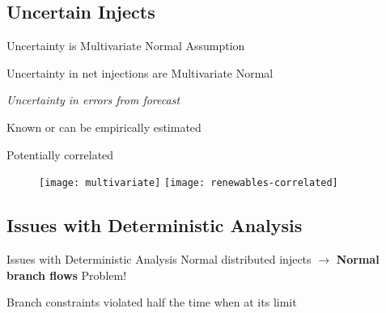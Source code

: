 
\subsection{Uncertain Injects}

\begin{frame}{Uncertainty is Multivariate Normal}
\alert{Assumption}

Uncertainty in net injections are Multivariate Normal
\bi
\item \textit{Uncertainty in errors from forecast}
\item Known or can be empirically estimated
\item Potentially correlated
\ei
\begin{center}
\begin{figure}
   \texttt{[image: multivariate]}
   \hfill
   \texttt{[image: renewables-correlated]}
\end{figure}
\end{center}

\end{frame}



\subsection{Issues with Deterministic Analysis}
\begin{frame}{Issues with Deterministic Analysis}
Normal distributed injects 
\pause 
$\rightarrow $
\textbf{Normal branch flows}\footnotemark
\vspace{20px}
\pause
\alert{Problem!}
\bi
\item Branch constraints violated half the time when at its limit
\ei
\end{frame}

